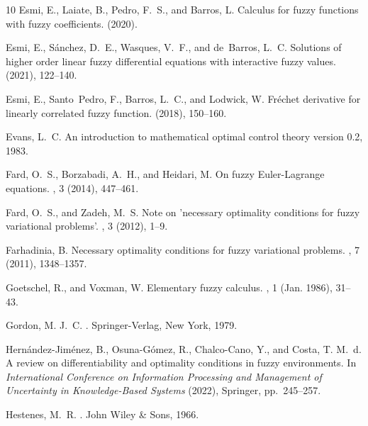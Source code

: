 \documentclass[12pt,a4paper]{article}
\begin{document}
\begin{thebibliography}{10}
{\sc Esmi, E., Laiate, B., Pedro, F.~S., and Barros, L.}
\newblock Calculus for fuzzy functions with fuzzy coefficients.
 (2020).

{\sc Esmi, E., S{\'a}nchez, D.~E., Wasques, V.~F., and de~Barros, L.~C.}
\newblock Solutions of higher order linear fuzzy differential equations with interactive fuzzy values.
 (2021), 122--140.

{\sc Esmi, E., Santo~Pedro, F., Barros, L.~C., and Lodwick, W.}
\newblock Fr{\'e}chet derivative for linearly correlated fuzzy function.
 (2018), 150--160.

{\sc Evans, L.~C.}
\newblock An introduction to mathematical optimal control theory version 0.2, 1983.

{\sc Fard, O.~S., Borzabadi, A.~H., and Heidari, M.}
\newblock On fuzzy {E}uler-{L}agrange equations.
, 3 (2014), 447--461.

{\sc Fard, O.~S., and Zadeh, M.~S.}
\newblock Note on 'necessary optimality conditions for fuzzy variational problems'.
, 3 (2012), 1--9.

{\sc Farhadinia, B.}
\newblock Necessary optimality conditions for fuzzy variational problems.
, 7 (2011), 1348--1357.

{\sc Goetschel, R., and Voxman, W.}
\newblock Elementary fuzzy calculus.
, 1 (Jan. 1986), 31--43.

{\sc Gordon, M. J.~C.}
.
\newblock Springer-Verlag, New York, 1979.

{\sc Hern{\'a}ndez-Jim{\'e}nez, B., Osuna-G{\'o}mez, R., Chalco-Cano, Y., and Costa, T. M.~d.}
\newblock A review on differentiability and optimality conditions in fuzzy environments.
\newblock In {\em International Conference on Information Processing and Management of Uncertainty in Knowledge-Based Systems\/} (2022), Springer, pp.~245--257.

{\sc Hestenes, M.~R.}
.
\newblock John Wiley \& Sons, 1966.


\end{thebibliography}
\end{document}
